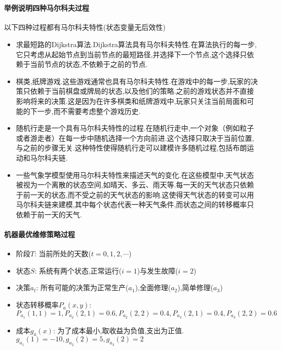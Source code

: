 \documentclass[a4paper]{article}
\begin{document}
\courseheader
{}
~
\paragraph{举例说明四种马尔科夫过程}
以下四种过程都有马尔科夫特性(状态变量无后效性)
\begin{itemize}
    \item 求最短路的Dijkstra算法.Dijkstra算法具有马尔科夫特性.在算法执行的每一步,它只考虑从起始节点到当前节点的最短路径,并选择下一个节点,这个选择只依赖于当前节点的状态,不依赖于之前的节点.
    \item 棋类,纸牌游戏.这些游戏通常也具有马尔科夫特性.在游戏中的每一步,玩家的决策只依赖于当前棋盘或牌局的状态,以及他们的策略.之前的游戏状态并不直接影响将来的决策.这是因为在许多棋类和纸牌游戏中,玩家只关注当前局面和可能的下一步,而不需要考虑整个游戏历史.
    \item 随机行走是一个具有马尔科夫特性的过程.在随机行走中,一个对象（例如粒子或者游走者）在每一步中随机选择一个方向前进.这个选择只取决于当前位置,与之前的步骤无关.这种特性使得随机行走可以建模许多随机过程,包括布朗运动和马尔科夫链.
    \item 一些气象学模型使用马尔科夫特性来描述天气的变化.在这些模型中,天气状态被视为一个离散的状态空间,如晴天、多云、雨天等.每一天的天气状态只依赖于前一天的状态,而不受之前的天气状态的影响.这使得天气状态的转变可以用马尔科夫链来建模,其中每个状态代表一种天气条件,而状态之间的转移概率只依赖于前一天的天气.
\end{itemize}
\paragraph{机器最优维修策略过程}
\begin{itemize}
    \item 阶段$T$: 当前所处的天数($t=0,1,2,\cdots$)
    \item 状态$S$: 系统有两个状态,正常运行($i=1$)与发生故障($i=2$)
    \item 决策$a_t$: 所有可能的决策为正常生产($a_1$),全面修理($a_2$),简单修理($a_3$)
    \item 状态转移概率$P_a(x,y)$: $P_{a_1}(1,1)=1,P_{a_2}(2,1)=0.6,P_{a_2}(2,2)=0.4,P_{a_3}(2,1)=0.4,P_{a_3}(2,2)=0.6$
    \item 成本$g_a(x)$: 为了成本最小,取收益为负值,支出为正值. $g_{a_1}(1)=-10,g_{a_2}(2)=5,g_{a_3}(2)=2$
\end{itemize}
\end{document}

